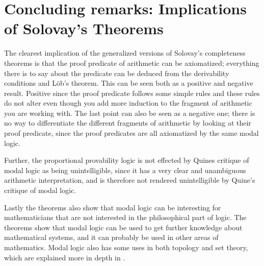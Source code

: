 \documentclass[../main.tex]{subfiles}
\begin{document}
\section{Concluding remarks: Implications of Solovay's Theorems}

The clearest implication of the generalized versions of Solovay's completeness
theorems is that the proof predicate of arithmetic can be axiomatized;
everything there is to say about the predicate can be deduced from the
derivability conditions and Löb's theorem. This can be seen both as a positive
and negative result. Positive since the proof predicate follows some simple
rules and these rules  do not alter even though you add more induction to the
fragment of arithmetic you are working with. The last point can also be seen
as a negative one; there is no way to differentiate the different fragments of
arithmetic by looking at their proof predicate, since the proof predicates are
all axiomatized by the same modal logic.

Further, the proportional provability logic is not effected by Quines critique of
modal logic as being unintelligible, since it has a very clear and unambiguous
arithmetic interpretation,  and is therefore not rendered unintelligible by Quine's critique of modal logic.

Lastly the theorems also show that modal logic can be interesting for
mathematicians that are not interested in the philosophical part of logic. The
theorems show that modal logic can be used to get further knowledge about
mathematical systems, and it can probably be used in other areas of mathematics.
Modal logic also has some uses in both topology and set theory, which are
explained more in depth in 
\parencite{Artemov2007}.
\end{document}
